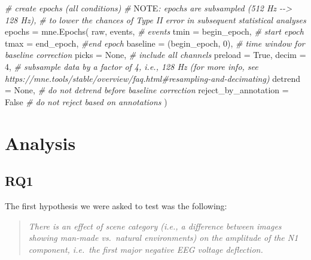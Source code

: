 \documentclass[
  man,floatsintext]{apa6}
\newenvironment{Shaded}{\begin{snugshade}}{\end{snugshade}}
\newcommand{\AlertTok}[1]{\textcolor[rgb]{0.94,0.16,0.16}{#1}}
\newcommand{\AttributeTok}[1]{\textcolor[rgb]{0.77,0.63,0.00}{#1}}
\newcommand{\CommentTok}[1]{\textcolor[rgb]{0.56,0.35,0.01}{\textit{#1}}}
\newcommand{\DecValTok}[1]{\textcolor[rgb]{0.00,0.00,0.81}{#1}}
\newcommand{\FunctionTok}[1]{\textcolor[rgb]{0.00,0.00,0.00}{#1}}
\newcommand{\NormalTok}[1]{#1}
\newcommand{\OtherTok}[1]{\textcolor[rgb]{0.56,0.35,0.01}{#1}}
\begin{document}
\begin{Shaded}
\begin{Highlighting}[]
        \CommentTok{\# create epochs (all conditions)}
        \CommentTok{\# }\AlertTok{NOTE}\CommentTok{: epochs are subsampled (512 Hz {-}{-}\textgreater{} 128 Hz),}
        \CommentTok{\# to lower the chances of Type II error in subsequent statistical analyses}
\NormalTok{        epochs }\OtherTok{=} \FunctionTok{mne.Epochs}\NormalTok{(}
\NormalTok{            raw, }
\NormalTok{            events, }\CommentTok{\# events}
            \AttributeTok{tmin =}\NormalTok{ begin\_epoch, }\CommentTok{\# start epoch}
            \AttributeTok{tmax =}\NormalTok{ end\_epoch, }\CommentTok{\#end epoch}
            \AttributeTok{baseline =}\NormalTok{ (begin\_epoch, }\DecValTok{0}\NormalTok{), }\CommentTok{\# time window for baseline correction}
            \AttributeTok{picks =}\NormalTok{ None, }\CommentTok{\# include all channels }
            \AttributeTok{preload =}\NormalTok{ True,}
            \AttributeTok{decim =} \DecValTok{4}\NormalTok{, }\CommentTok{\# subsample data by a factor of 4, i.e., 128 Hz (for more info, see https://mne.tools/stable/overview/faq.html\#resampling{-}and{-}decimating)}
            \AttributeTok{detrend =}\NormalTok{ None, }\CommentTok{\# do not detrend before baseline correction        }
            \AttributeTok{reject\_by\_annotation =}\NormalTok{ False }\CommentTok{\# do not reject based on annotations}
\NormalTok{            )}
\end{Highlighting}
\end{Shaded}

\hypertarget{analysis}{%
\section{Analysis}\label{analysis}}

\hypertarget{rq1}{%
\subsection{RQ1}\label{rq1}}

The first hypothesis we were asked to test was the following:

\begin{quote}
\emph{There is an effect of scene category (i.e., a difference between images showing man-made vs.~natural environments) on the amplitude of the N1 component, i.e.~the first major negative EEG voltage deflection.}
\end{quote}
\end{document}
